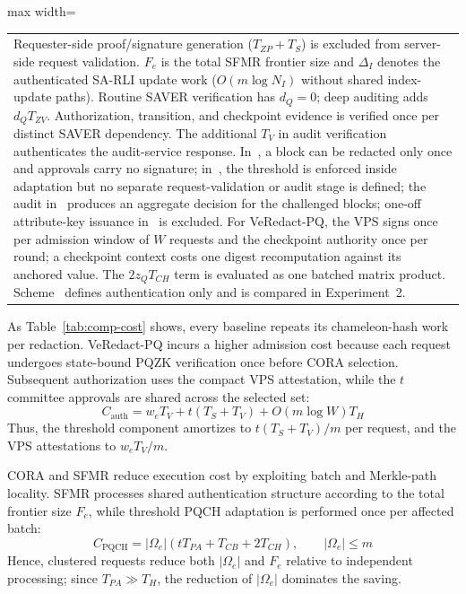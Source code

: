 \documentclass[lettersize,journal]{IEEEtran}
\begin{document}
\begin{table}[t]
\begin{adjustbox}{max width=\textwidth}
\begin{tabular}{lcccc}
\bottomrule
\multicolumn{5}{p{0.96\textwidth}}{\footnotesize
Requester-side proof/signature generation ($T_{ZP}+T_S$) is excluded
from server-side request validation. $F_e$ is the total SFMR frontier
size and $\Delta_I$ denotes the authenticated SA-RLI update work
($O(m\log N_I)$ without shared index-update paths). Routine SAVER
verification has $d_Q=0$; deep auditing adds $d_QT_{ZV}$.
Authorization, transition, and checkpoint evidence is verified once
per distinct SAVER dependency. The additional $T_V$ in audit
verification authenticates the audit-service response. In~\cite{ref1},
a block can be redacted only once and approvals carry no signature;
in~\cite{ref27}, the threshold is enforced inside adaptation but no
separate request-validation or audit stage is defined; the audit
in~\cite{ref13} produces an aggregate decision for the challenged
blocks; one-off attribute-key issuance in~\cite{ref34} is excluded.
For VeRedact-PQ, the VPS signs once per admission window
of $W$ requests and the checkpoint authority once per round; a checkpoint
context costs one digest recomputation against its anchored value. The
$2z_QT_{CH}$ term is evaluated as one batched matrix product. Scheme~\cite{ref39} defines authentication only and is compared in
Experiment~2.}
\end{tabular}
\end{adjustbox}
\end{table}

As Table~\ref{tab:comp-cost} shows, every baseline repeats its
chameleon-hash work per redaction. VeRedact-PQ incurs a higher admission cost because each request
undergoes state-bound PQZK verification once before CORA selection.
Subsequent authorization uses the compact VPS attestation, while the
$t$ committee approvals are shared across the selected set:
\begin{equation}
C_{\mathrm{auth}}
=
w_eT_V+t(T_S+T_V)+O(m\log W)T_H
\label{eq:cauth}
\end{equation}
Thus, the threshold component amortizes to
$t(T_S+T_V)/m$ per request, and the VPS attestations to
$w_eT_V/m$.

CORA and SFMR reduce execution cost by exploiting batch and Merkle-path
locality. SFMR processes shared authentication structure according to
the total frontier size $F_e$, while threshold PQCH adaptation is
performed once per affected batch:
\begin{equation}
C_{\mathrm{PQCH}}
=
|\Omega_e|(tT_{PA}+T_{CB}+2T_{CH}),
\qquad |\Omega_e|\leq m
\end{equation}
Hence, clustered requests reduce both $|\Omega_e|$ and $F_e$ relative
to independent processing; since $T_{PA}\gg T_H$, the reduction of
$|\Omega_e|$ dominates the saving.
\end{document}

